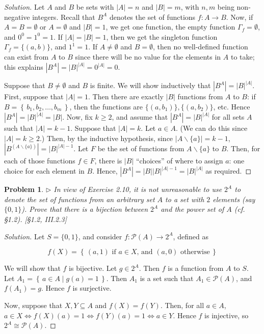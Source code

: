 \documentclass[fontsize=14pt]{scrartcl}
\newtheorem{problem-internal}{Problem}[subsection]
\newenvironment{problem}{
  \medskip
  \begin{problem-internal}
}{
  \end{problem-internal}
}
\newenvironment{solution}{
  \begin{proof}[Solution]
  \vspace{-8px}
  \setlength{\parskip}{4px}
  \setlength{\parindent}{0px}
}{
  \end{proof}
}
\newcommand{\set}[1]{\left\{\,#1\,\right\}}
\newcommand{\abs}[1]{\left|#1\right|}
\begin{document}
\begin{solution}
Let $A$ and $B$ be sets with $\abs{A}=n$ and $\abs{B}=m$, with $n,m$ being
non-negative integers. Recall that $B^A$ denotes the set of functions $f:A\to
B$. Now, if $A=B=\emptyset$ or $A=\emptyset$ and $\abs{B}=1$, we get one
function, the empty function $\Gamma_f = \emptyset$, and $0^0 = 1^0 = 1$. If
$\abs{A} = \abs{B} = 1$, then we get the singleton function
$\Gamma_f=\{(a,b)\}$, and $1^1 = 1$. If $A\neq\emptyset$ and $B=\emptyset$, then
no well-defined function can exist from $A$ to $B$ since there will be no value
for the elements in $A$ to take; this explains $\abs{B^A} = \abs{B}^{\abs{A}} =
0^{\abs{A}} = 0$.

Suppose that $B\neq\emptyset$ and $B$ is finite. We will show inductively that
$\abs{B^A} = \abs{B}^{\abs{A}}$. First, suppose that $\abs{A} = 1$.  Then there
are exactly $\abs{B}$ functions from $A$ to $B$: if $B=\set{b_1,b_2,\dots,b_m}$,
then the functions are $\{(a,b_1)\}, \{(a,b_2)\}$, etc. Hence $\abs{B^A} =
\abs{B}^{\abs{A}} = \abs{B}$.  Now, fix $k\geq 2$, and assume that $\abs{B^A} =
\abs{B}^{\abs{A}}$ for all sets $A$ such that $\abs{A}=k-1$. Suppose that
$\abs{A}=k$. Let $a\in A$. (We can do this since $\abs{A}=k\geq 2$.) Then, by
the inductive hypothesis, since $\abs{A\backslash\{a\}}=k-1$,
$\abs{B^{(A\backslash\{a\})}} = \abs{B}^{\abs{A}-1}$. Let $F$ be the set of
functions from $A\backslash\{a\}$ to $B$.  Then, for each of those functions
$f\in F$, there is $\abs{B}$ ``choices'' of where to assign $a$: one choice for
each element in $B$. Hence, $\abs{B^A} = \abs{B}\abs{B}^{\abs{A}-1} =
\abs{B}^{\abs{A}}$ as required.
\end{solution}


\begin{problem}
$\rhd$ In view of Exercise 2.10, it is not unreasonable to use $2^A$ to denote
the set of functions from an arbitrary set $A$ to a set with $2$ elements (say
$\{0,1\}$). Prove that there is a bijection between $2^A$ and the \textit{power
set} of $A$ (cf. \S1.2). [\S1.2, III.2.3]
\end{problem}

\begin{solution}
Let $S = \{0,1\}$, and consider $f:\mathcal{P}(A)\to 2^A$, defined as

\[ f(X) = \set{(a,1) \text{ if $a\in X$, and }(a,0) \text{ otherwise}} \]

We will show that $f$ is bijective. Let $g\in 2^A$. Then $f$ is a
function from $A$ to $S$. Let $A_1 = \set{a\in A\mid g(a) = 1}$. Then $A_1$ is a
set such that $A_1\in\mathcal{P}(A)$, and $f(A_1)=g$. Hence $f$ is surjective.

Now, suppose that $X,Y\subseteq A$ and $f(X) = f(Y)$. Then, for all $a\in A$,
$a\in X \iff f(X)(a) = 1 \iff f(Y)(a) = 1 \iff a\in Y$. Hence $f$ is injective,
so $2^A\cong\mathcal{P}(A)$.
\end{solution}
\end{document}
